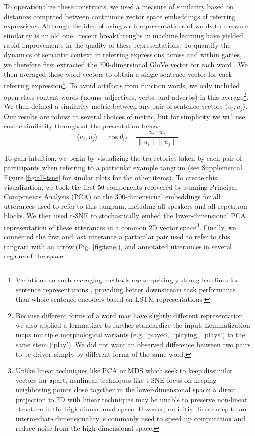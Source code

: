 \documentclass[alpha-refs]{wiley-article}
\begin{document}
To operationalize these constructs, we used a measure of similarity based on distances computed between continuous vector space embeddings of referring expressions.
Although the idea of using such representations of words to measure similarity is an old one \citep{osgood1952nature,landauer_solution_1997,bengio_neural_2003}, recent breakthroughs in machine learning have yielded rapid improvements in the quality of these representations.
To quantify the dynamics of semantic context in referring expressions across and within games, we therefore first extracted the 300-dimensional GloVe vector for each word \citep{pennington2014glove}.
We then averaged these word vectors to obtain a single sentence vector for each referring expression\footnote{Variations on such averaging methods are surprisingly strong baselines for sentence representations \citep{arora2017asimple}, providing better downstream task performance than whole-sentence encoders based on LSTM representations \citep{KirosEtAl15_SkipThought}}.
To avoid artifacts from function words, we only included open-class content words (nouns, adjectives, verbs, and adverbs) in this average\footnote{Because different forms of a word may have slightly different representation, we also applied a lemmatizer to further standardize the input. Lemmatization maps multiple morphological variants (e.g. `played,' `playing,' `plays') to the same stem (`play'). We did not want an observed difference between two pairs to be driven simply by different forms of the same word.}.
We then defined a similarity metric between any pair of sentence vectors $\langle u_i, u_j \rangle$.
Our results are robust to several choices of metric, but for simplicity we will use cosine similarity throughout the presentation below: $$\langle u_i, u_j \rangle = \cos \theta_{ij} = \frac{u_i \cdot u_j}{\| u_i\| \| u_j \|}$$

To gain intuition, we begin by visualizing the trajectories taken by each pair of participants when referring to a particular example tangram (see Supplemental Figure \ref{fig:all-tsne} for similar plots for the other items).
To create this visualization, we took the first 50 components recovered by running Principal Components Analysis (PCA) on the 300-dimensional embeddings for all utterances used to refer to this tangram, including all speakers and all repetition blocks.
We then used t-SNE \citep{maaten2008visualizing} to stochastically embed the lower-dimensional PCA representation of these utterances in a common 2D vector space\footnote{Unlike linear techniques like PCA or MDS which seek to keep dissimilar vectors far apart, nonlinear techniques like t-SNE focus on keeping neighboring points close together in the lower-dimensional space; a direct projection to 2D with linear techniques may be unable to preserve non-linear structure in the high-dimensional space. However, an initial linear step to an intermediate dimensionality is commonly used to speed up computation and reduce noise from the high-dimensional space.}. 
Finally, we connected the first and last utterance a particular pair used to refer to this tangram with an arrow (Fig. \ref{fig:tsne}), and annotated utterances in several regions of the space.
\end{document}
